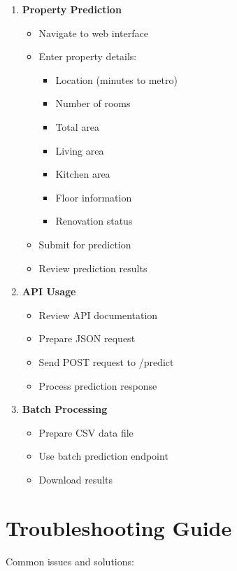 \documentclass[12pt,a4paper]{report}
\begin{document}
\begin{enumerate}
    \item \textbf{Property Prediction}
    \begin{itemize}
        \item Navigate to web interface
        \item Enter property details:
        \begin{itemize}
            \item Location (minutes to metro)
            \item Number of rooms
            \item Total area
            \item Living area
            \item Kitchen area
            \item Floor information
            \item Renovation status
        \end{itemize}
        \item Submit for prediction
        \item Review prediction results
    \end{itemize}
    
    \item \textbf{API Usage}
    \begin{itemize}
        \item Review API documentation
        \item Prepare JSON request
        \item Send POST request to /predict
        \item Process prediction response
    \end{itemize}
    
    \item \textbf{Batch Processing}
    \begin{itemize}
        \item Prepare CSV data file
        \item Use batch prediction endpoint
        \item Download results
    \end{itemize}
\end{enumerate}

\section{Troubleshooting Guide}
Common issues and solutions:
\end{document}
